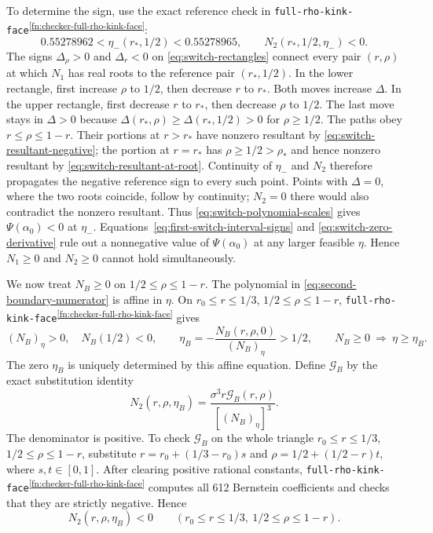 \documentclass[11pt]{article}
\theoremstyle{remark}
\theoremstyle{plain}
\begin{document}
To determine the sign, use the exact reference check in
\nolinkurl{full-rho-kink-face}\textsuperscript{\ref{fn:checker-full-rho-kink-face}}:
\begin{equation}
 0.55278962<\eta_-(r_*,1/2)<0.55278965,\qquad
 N_2(r_*,1/2,\eta_-)<0.
 \label{eq:switch-reference-sign}
\end{equation}
The signs $\Delta_\rho>0$ and $\Delta_r<0$ on
\eqref{eq:switch-rectangles} connect every pair $(r,\rho)$ at which
$N_1$ has real roots to the reference pair $(r_*,1/2)$. In the lower rectangle, first increase $\rho$
to $1/2$, then decrease $r$ to $r_*$. Both moves increase $\Delta$.
In the upper rectangle, first decrease $r$ to $r_*$, then decrease
$\rho$ to $1/2$. The last move stays in $\Delta>0$ because
$\Delta(r_*,\rho)\ge\Delta(r_*,1/2)>0$ for $\rho\ge1/2$.
The paths obey $r\le\rho\le1-r$. Their portions at $r>r_*$ have
nonzero resultant by \eqref{eq:switch-resultant-negative}; the
portion at $r=r_*$ has $\rho\ge1/2>\rho_*$ and hence nonzero
resultant by \eqref{eq:switch-resultant-at-root}.
Continuity of $\eta_-$ and $N_2$ therefore propagates the negative
reference sign to every such point. Points with $\Delta=0$, where
the two roots coincide, follow by continuity; $N_2=0$ there would
also contradict the nonzero resultant.
Thus \eqref{eq:switch-polynomial-scales} gives $\Psi(\alpha_0)<0$
at $\eta_-$. Equations~\eqref{eq:first-switch-interval-signs} and
\eqref{eq:switch-zero-derivative} rule out a nonnegative value of
$\Psi(\alpha_0)$ at any larger feasible $\eta$. Hence $N_1\ge0$ and
$N_2\ge0$ cannot hold simultaneously.

We now treat $N_B\ge0$ on $1/2\le\rho\le1-r$.
The polynomial in \eqref{eq:second-boundary-numerator} is affine
in $\eta$. On $r_0\le r\le1/3$, $1/2\le\rho\le1-r$,
\nolinkurl{full-rho-kink-face}\textsuperscript{\ref{fn:checker-full-rho-kink-face}} gives
\begin{equation}
 (N_B)_\eta>0,\quad N_B(1/2)<0,\qquad
 \eta_B=-\frac{N_B(r,\rho,0)}{(N_B)_\eta}>1/2,
 \qquad N_B\ge0\ \Longrightarrow\ \eta\ge\eta_B.
 \label{eq:second-switch-root}
\end{equation}
The zero $\eta_B$ is uniquely determined by this affine equation.
Define $\mathcal G_B$ by the exact substitution identity
\begin{equation}
 N_2(r,\rho,\eta_B)
       =\frac{\sigma^3r\mathcal G_B(r,\rho)}{[(N_B)_\eta]^3}.
 \label{eq:second-switch-substitution}
\end{equation}
The denominator is positive. To check $\mathcal G_B$ on the whole
triangle $r_0\le r\le1/3$, $1/2\le\rho\le1-r$, substitute
$r=r_0+(1/3-r_0)s$ and $\rho=1/2+(1/2-r)t$, where $s,t\in[0,1]$.
After clearing positive rational constants,
\nolinkurl{full-rho-kink-face}\textsuperscript{\ref{fn:checker-full-rho-kink-face}} computes all 612 Bernstein
coefficients and checks that they are strictly negative. Hence
\begin{equation}
 N_2(r,\rho,\eta_B)<0\qquad
 (r_0\le r\le1/3,\ 1/2\le\rho\le1-r).
 \label{eq:second-switch-negative}
\end{equation}
\end{document}
